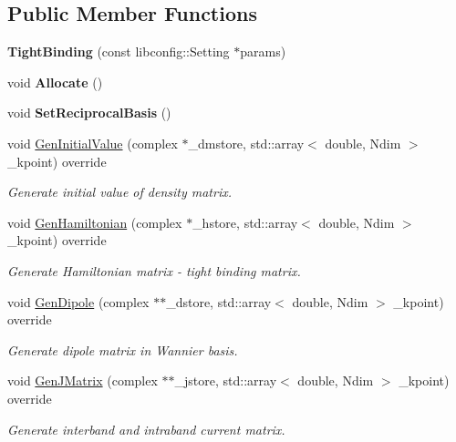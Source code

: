 \subsection*{Public Member Functions}
\begin{DoxyCompactItemize}
\item 
\mbox{\label{class_tight_binding_a6eb970de6a693dddfc4f5c1f2abbcc03}} 
{\bfseries Tight\+Binding} (const libconfig\+::\+Setting $\ast$params)
\item 
\mbox{\label{class_tight_binding_a1de589a66766bdf3daccb58ca39496de}} 
void {\bfseries Allocate} ()
\item 
\mbox{\label{class_tight_binding_a257241a67747950e8c5842f02c614fd8}} 
void {\bfseries Set\+Reciprocal\+Basis} ()
\item 
void \hyperlink{class_tight_binding_a4436babed177035ec217d9bedb8dfbf9}{Gen\+Initial\+Value} (complex $\ast$\+\_\+dmstore, std\+::array$<$ double, Ndim $>$ \+\_\+kpoint) override
\begin{DoxyCompactList}\small\item\em Generate initial value of density matrix. \end{DoxyCompactList}\item 
void \hyperlink{class_tight_binding_a228397138efbc49a23a1e528b22505d8}{Gen\+Hamiltonian} (complex $\ast$\+\_\+hstore, std\+::array$<$ double, Ndim $>$ \+\_\+kpoint) override
\begin{DoxyCompactList}\small\item\em Generate Hamiltonian matrix -\/ tight binding matrix. \end{DoxyCompactList}\item 
void \hyperlink{class_tight_binding_a35d001bd21173065f9f3b2de595b5af6}{Gen\+Dipole} (complex $\ast$$\ast$\+\_\+dstore, std\+::array$<$ double, Ndim $>$ \+\_\+kpoint) override
\begin{DoxyCompactList}\small\item\em Generate dipole matrix in Wannier basis. \end{DoxyCompactList}\item 
void \hyperlink{class_tight_binding_a6344b139ca89723d7b71b6efd9c834d9}{Gen\+J\+Matrix} (complex $\ast$$\ast$\+\_\+jstore, std\+::array$<$ double, Ndim $>$ \+\_\+kpoint) override
\begin{DoxyCompactList}\small\item\em Generate interband and intraband current matrix. \end{DoxyCompactList}\item 

\end{DoxyCompactItemize}
